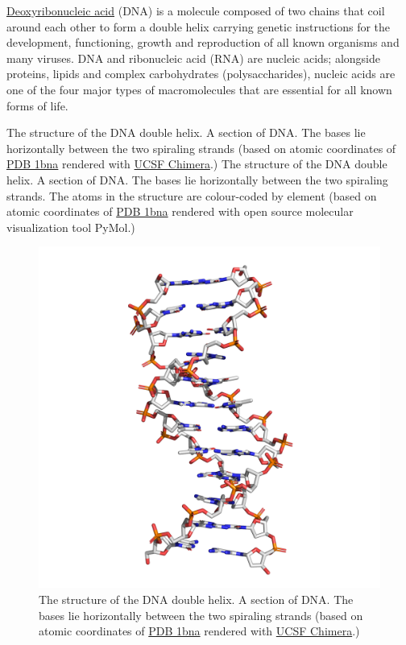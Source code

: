\href{https://en.wikipedia.org/wiki/DNA}{Deoxyribonucleic acid} (DNA) is a molecule composed of two chains that coil around each other to form a double helix carrying genetic instructions for the development, functioning, growth and reproduction of all known organisms and many viruses. DNA and ribonucleic acid (RNA) are nucleic acids; alongside proteins, lipids and complex carbohydrates (polysaccharides), nucleic acids are one of the four major types of macromolecules that are essential for all known forms of life.

The structure of the DNA double helix. A section of DNA. The bases lie horizontally between the two spiraling strands (based on atomic coordinates of \href{https://www.rcsb.org/structure/1bna}{PDB 1bna} rendered with \href{https://www.cgl.ucsf.edu/chimera/}{UCSF Chimera}.) The structure of the DNA double helix. A section of DNA. The bases lie horizontally between the two spiraling strands. The atoms in the structure are colour-coded by element (based on atomic coordinates of \href{https://www.rcsb.org/structure/1bna}{PDB 1bna} rendered with open source molecular visualization tool PyMol.)

\begin{figure}

{\centering \includegraphics[width=0.7\linewidth]{./figures/dna/dna_licorice} 

}

\caption{The structure of the DNA double helix. A section of DNA. The bases lie horizontally between the two spiraling strands (based on atomic coordinates of \href{https://www.rcsb.org/structure/1bna}{PDB 1bna} rendered with \href{https://www.cgl.ucsf.edu/chimera/}{UCSF Chimera}.)}\label{fig:dnastruc}
\end{figure}

